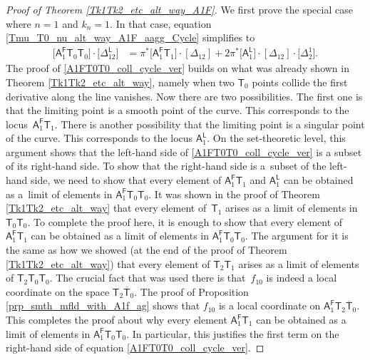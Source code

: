\documentclass[pdftex]{sigma}
\numberwithin{equation}{section}
\begin{document}
\begin{proof}[Proof of Theorem \ref{Tk1Tk2_etc_alt_way_A1F}]
We first prove the special case where
$n = 1$ and $k_n = 1$.
In that case, equation \eqref{Tmu_T0_nu_alt_way_A1F_aagg_Cycle} simplifies to
\begin{align}
\bigl[\mathsf{A}_1^{\mathsf{F}} \mathsf{T}_{0}\mathsf{T}_0\bigr] \cdot \bigl[\Delta_{12}^{\mathsf{L}}\bigr] & =
\pi^*\bigl[\mathsf{A}_1^{\mathsf{F}} \mathsf{T}_{1}\bigr] \cdot [\Delta_{12}] +
2 \pi^*\bigl[\mathsf{A}_1^{\mathsf{L}}\bigr]\cdot [\Delta_{12}]\cdot \bigl[\Delta_{2}^1\bigr].
\label{A1FT0T0_coll_cycle_ver}
\end{align}
The proof of \eqref{A1FT0T0_coll_cycle_ver} builds on what was already shown in
Theorem \ref{Tk1Tk2_etc_alt_way}, namely when two $\mathsf{T}_0$ points collide the first derivative along the line
vanishes. Now there are two possibilities. The first one is that the limiting point is a smooth point of the curve.
This corresponds to the locus~$\mathsf{A}_1^{\mathsf{F}}\mathsf{T}_1$. There is another possibility that
the limiting point is a singular point of the curve. This corresponds to the locus
$\mathsf{A}_1^{\mathsf{L}}$. On the set-theoretic level, this argument shows that the left-hand side of
\eqref{A1FT0T0_coll_cycle_ver} is a subset of its right-hand side. To show that the right-hand side is a~subset of
the left-hand side, we need to show that every element of
$\mathsf{A}_1^{\mathsf{F}}\mathsf{T}_1$ and $\mathsf{A}_1^{\mathsf{L}}$ can be obtained as a~limit of elements
in $\mathsf{A}_1^{\mathsf{F}} \mathsf{T}_{0}\mathsf{T}_0$. It was shown in the proof of Theorem
\ref{Tk1Tk2_etc_alt_way} that every element of~$\mathsf{T}_1$ arises as a limit of elements in
$\mathsf{T}_{0}\mathsf{T}_0$. To complete the proof here, it is enough to show that
every element of
$\mathsf{A}_1^{\mathsf{F}}\mathsf{T}_1$ can be obtained as a limit of elements
in $\mathsf{A}_1^{\mathsf{F}} \mathsf{T}_{0}\mathsf{T}_0$. The argument for it is the same as how we showed
(at the end of the proof of Theorem \ref{Tk1Tk2_etc_alt_way}) that
every element of $\mathsf{T}_2\mathsf{T}_1 $
arises as a limit of elements of $\mathsf{T}_2 \mathsf{T}_0 \mathsf{T}_0$.
The crucial fact that was used there is that~$f_{10}$ is indeed a local coordinate
on the space $\mathsf{T}_2 \overline{\mathsf{T}}_0$.
The proof of Proposition \ref{prp_smth_mfld_with_A1f_ag} shows that
$f_{10}$ is a local coordinate on
$\mathsf{A}_1^{\mathsf{F}}\mathsf{T}_2 \overline{\mathsf{T}}_0$.
This completes the proof about why every element
$\mathsf{A}_1^{\mathsf{F}}\mathsf{T}_1$
can be obtained as a limit of elements
in $\mathsf{A}_1^{\mathsf{F}} \mathsf{T}_{0}\mathsf{T}_0$.
In particular, this justifies the first term on the right-hand side of
equation \eqref{A1FT0T0_coll_cycle_ver}.


\end{proof}
\end{document}

